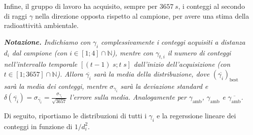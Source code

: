 \documentclass{article}
\newcommand*{\bestp}[1]{{\left(#1\right)}_\text{best}}
\begin{document}
Infine, il gruppo di lavoro ha acquisito, sempre per $\qty{3657}{s}$,
i conteggi al secondo di raggi $\gamma$ nella direzione opposta rispetto
al campione,
per avere una stima della radioattività ambientale.

\emph{
    \textbf{Notazione.} Indichiamo con $\gamma_i$ complessivamente i conteggi
    acquisiti a distanza $d_i$ dal campione (con $i\in\left[1;4\right]\cap\mathbb{N}$),
    mentre con $\gamma_{t,i}$ il numero di conteggi nell'intervallo temporale
    $\left[(t-1)\;\unit{s};t\;\unit{s}\right]$ dall'inizio dell'acquisizione (con
    $t\in\left[1;3657\right]\cap\mathbb{N}$).
    Allora $\overline{\gamma_i}$ sarà la media della distribuzione, dove
    $\bestp{\overline{\gamma_i}}$ sarà la media dei conteggi,
    mentre $\sigma_{\gamma_i}$ sarà la deviazione standard e
    $
        \delta\!\left(\overline{\gamma_i}\right) =
        \sigma_{\overline{\gamma_i}} =
        \frac{\sigma_{\gamma_i}}{\sqrt{3657}}
    $
    l'errore sulla media.
    Analogamente per \emph{
        $\gamma_\text{amb}$,
        $\gamma_\text{amb}$ e
        $\overline{\gamma_\text{amb}}$.
    }
}

Di seguito, riportiamo le distribuzioni di tutti i $\gamma_i$
e la regerssione lineare dei conteggi in funzione di $1/d_i^2$.
\end{document}

